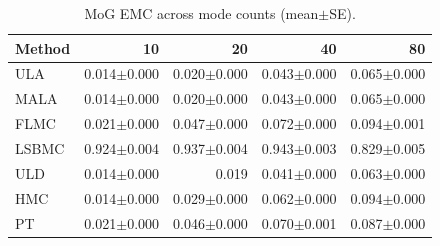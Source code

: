 \begin{table}[t]
\centering
\small
\caption{MoG EMC across mode counts (mean$\pm$SE).}
\label{tab:mog_emc_scaling}
\begin{tabular}{lrrrr}
\toprule
Method & 10 & 20 & 40 & 80 \\
\midrule
ULA & 0.014$\pm$0.000 & 0.020$\pm$0.000 & 0.043$\pm$0.000 & 0.065$\pm$0.000 \\
MALA & 0.014$\pm$0.000 & 0.020$\pm$0.000 & 0.043$\pm$0.000 & 0.065$\pm$0.000 \\
FLMC & 0.021$\pm$0.000 & 0.047$\pm$0.000 & 0.072$\pm$0.000 & 0.094$\pm$0.001 \\
LSBMC & 0.924$\pm$0.004 & 0.937$\pm$0.004 & 0.943$\pm$0.003 & 0.829$\pm$0.005 \\
ULD & 0.014$\pm$0.000 & 0.019 & 0.041$\pm$0.000 & 0.063$\pm$0.000 \\
HMC & 0.014$\pm$0.000 & 0.029$\pm$0.000 & 0.062$\pm$0.000 & 0.094$\pm$0.000 \\
PT & 0.021$\pm$0.000 & 0.046$\pm$0.000 & 0.070$\pm$0.001 & 0.087$\pm$0.000 \\
\bottomrule
\end{tabular}
\end{table}